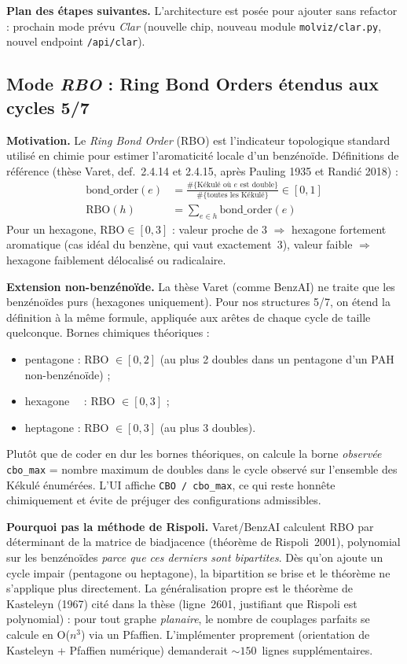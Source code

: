 \textbf{Plan des étapes suivantes.} L'architecture est posée pour ajouter
sans refactor : prochain mode prévu \emph{Clar} (nouvelle chip, nouveau
module \texttt{molviz/clar.py}, nouvel endpoint \texttt{/api/clar}).

\subsection{Mode \emph{RBO} : Ring Bond Orders étendus aux cycles 5/7}
\label{sec:molviz-rbo}


\textbf{Motivation.} Le \emph{Ring Bond Order} (RBO) est l'indicateur
topologique standard utilisé en chimie pour estimer l'aromaticité locale
d'un benzénoïde. Définitions de référence (thèse Varet, def.~2.4.14 et
2.4.15, après Pauling 1935 et Randić 2018) :
\begin{align*}
  \text{bond\_order}(e) &= \frac{\#\{\text{K\'ekul\'e o\`u } e \text{ est double}\}}{\#\{\text{toutes les K\'ekul\'e}\}} \in [0, 1] \\
  \text{RBO}(h) &= \sum_{e \in h} \text{bond\_order}(e)
\end{align*}
Pour un hexagone, $\text{RBO} \in [0, 3]$ : valeur proche de 3
$\Rightarrow$ hexagone fortement aromatique (cas idéal du benzène, qui
vaut exactement~3), valeur faible $\Rightarrow$ hexagone faiblement
délocalisé ou radicalaire.

\textbf{Extension non-benzénoïde.} La thèse Varet (comme BenzAI) ne
traite que les benzénoïdes purs (hexagones uniquement). Pour nos
structures 5/7, on étend la définition à la même formule, appliquée aux
arêtes de chaque cycle de taille quelconque. Bornes chimiques
théoriques :
\begin{itemize}
  \item pentagone : RBO $\in [0, 2]$ (au plus 2 doubles dans un
    pentagone d'un PAH non-benzénoïde) ;
  \item hexagone~~ : RBO $\in [0, 3]$ ;
  \item heptagone : RBO $\in [0, 3]$ (au plus 3 doubles).
\end{itemize}
Plutôt que de coder en dur les bornes théoriques, on calcule la borne
\emph{observée} \texttt{cbo\_max} = nombre maximum de doubles dans le
cycle observé sur l'ensemble des Kékulé énumérées. L'UI affiche
\texttt{CBO / cbo\_max}, ce qui reste honnête chimiquement et évite de
préjuger des configurations admissibles.

\textbf{Pourquoi pas la méthode de Rispoli.} Varet/BenzAI calculent RBO
par déterminant de la matrice de biadjacence (théorème de
Rispoli~2001), polynomial sur les benzénoïdes \emph{parce que ces
derniers sont bipartites}. Dès qu'on ajoute un cycle impair (pentagone
ou heptagone), la bipartition se brise et le théorème ne s'applique
plus directement. La généralisation propre est le théorème de Kasteleyn
(1967) cité dans la thèse (ligne~2601, justifiant que Rispoli est
polynomial) : pour tout graphe \emph{planaire}, le nombre de couplages
parfaits se calcule en O($n^3$) via un Pfaffien. L'implémenter
proprement (orientation de Kasteleyn + Pfaffien numérique) demanderait
${\sim}150$~lignes supplémentaires.

